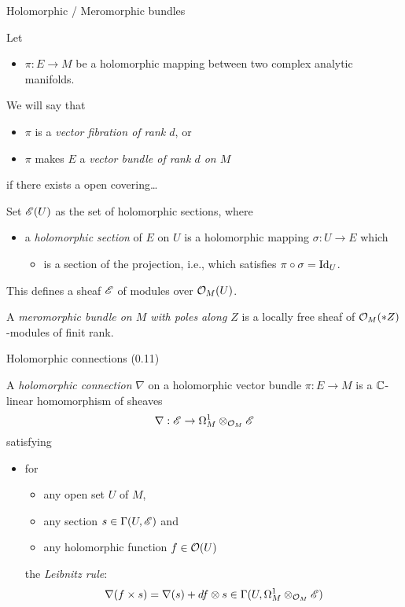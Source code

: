 \begin{frame}[t]{Holomorphic / Meromorphic bundles}
  \begin{defn}
    Let 
    \begin{itemize}
      \item $\pi:E\to M$ be a holomorphic mapping between two complex analytic
        manifolds.
    \end{itemize}
    We will say that
    \begin{itemize}
      \item $\pi$ is a \emph{vector fibration of rank $d$}, or
      \item $\pi$ makes $E$ a \emph{vector bundle of rank $d$ on $M$}
    \end{itemize}
    if there exists a open covering\dots 
  \end{defn}
  Set $\mathscr{E}(U)$ as the set of holomorphic sections, where
  \begin{itemize}
    \item a \emph{holomorphic section} of $E$ on $U$ is a holomorphic mapping
      $\sigma:U\to E$ which
      \begin{itemize}
        \item is a section of the projection, i.e., which satisfies
          $\pi\circ\sigma=\operatorname{Id}_U$.
      \end{itemize}
  \end{itemize}
  This defines a sheaf $\mathscr{E}$ of modules over $\mathcal{O}_M(U)$.
  \begin{prop}
  \end{prop}

  \begin{defn}
    A \emph{meromorphic bundle on $M$ with poles along $Z$} is a locally free
    sheaf of $\mathcal{O}_M(*Z)$-modules of finit rank.
  \end{defn}
\end{frame}

\begin{frame}[t]{Holomorphic connections (0.11)}
  \begin{defn}
    A \emph{holomorphic connection} $\nabla$ on a holomorphic vector bundle
    $\pi:E\to M$ is a $\mathbb{C}$-linear homomorphism of sheaves
    \[
      \nabla:\mathscr{E}\to\Omega_M^1\otimes_{\mathcal{O}_M}\mathscr{E}
    \]
    satisfying
    \begin{itemize}
      \item for 
        \begin{itemize}
          \item any open set $U$ of $M$,
          \item any section $s\in\Gamma(U,\mathscr{E})$ and
          \item any holomorphic function $f\in\mathcal{O}(U)$
        \end{itemize}
        the \emph{Leibnitz rule}:
        \[
          \nabla(f\times s)=\nabla(s)+df\otimes
          s\in\Gamma(U,\Omega_M^1\otimes_{\mathcal{O}_M}\mathscr{E})
        \]
    \end{itemize}
  \end{defn}
\end{frame}

